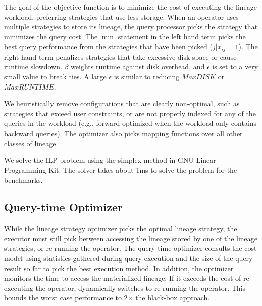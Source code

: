 The goal of the objective function is to minimize the cost of executing the
lineage workload, preferring strategies that use less storage.  When an
operator uses multiple strategies to store its lineage, the query processor
picks the strategy that minimizes the query cost.  The $\min$ statement in the
left hand term picks the best query performance from the strategies that have
been picked ($j | x_{ij} = 1$).  The right hand term penalizes strategies that
take excessive disk space or cause runtime slowdown.  $\beta$ weights runtime
against disk overhead, and $\epsilon$ is set to a very small value to break
ties. A large $\epsilon$ is similar to reducing $MaxDISK$ or $MaxRUNTIME$.

We heuristically remove configurations that are clearly non-optimal, such as
strategies that exceed user constraints, or are not properly indexed for any of
the queries in the workload (e.g., forward optimized when the workload only
contains backward queries).  The optimizer also picks mapping functions over
all other classes of lineage.

We solve the ILP problem using the simplex method in GNU Linear Programming
Kit.  The solver takes about 1ms to solve the problem for the 
benchmarks.




\subsection{Query-time Optimizer}
\label{s:cmopt}

While the lineage strategy optimizer picks the optimal lineage strategy, the
executor must still pick between accessing the lineage stored by one of the
lineage strategies, or re-running the operator.  The query-time optimizer
consults the cost model using statistics gathered during query execution and
the size of the query result so far to pick the best execution method.  In
addition, the optimizer monitors the time to access the materialized lineage.
If it exceeds the cost of re-executing the operator, \sys{} dynamically
switches to re-running the operator.  This bounds the worst case performance to
2$\times$ the black-box approach.







